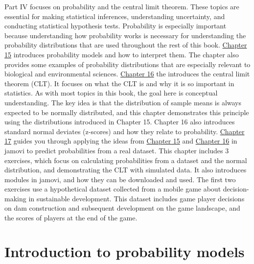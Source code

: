 \documentclass[
]{scrbook}
\begin{document}
Part IV focuses on probability and the central limit theorem.
These topics are essential for making statistical inferences, understanding uncertainty, and conducting statistical hypothesis tests.
Probability is especially important because understanding how probability works is necessary for understanding the probability distributions that are used throughout the rest of this book.
\protect\hyperlink{Chapter_15}{Chapter 15} introduces probability models and how to interpret them.
The chapter also provides some examples of probability distributions that are especially relevant to biological and environmental sciences.
\protect\hyperlink{Chapter_16}{Chapter 16} the introduces the central limit theorem (CLT).
It focuses on what the CLT is and why it is so important in statistics.
As with most topics in this book, the goal here is conceptual understanding.
The key idea is that the distribution of sample means is always expected to be normally distributed, and this chapter demonstrates this principle using the distributions introduced in Chapter 15.
Chapter 16 also introduces standard normal deviates (z-scores) and how they relate to probability.
\protect\hyperlink{Chapter_17}{Chapter 17} guides you through applying the ideas from \protect\hyperlink{Chapter_15}{Chapter 15} and \protect\hyperlink{Chapter_16}{Chapter 16} in jamovi to predict probabilities from a real dataset.
This chapter includes 3 exercises, which focus on calculating probabilities from a dataset and the normal distribution, and demonstrating the CLT with simulated data.
It also introduces modules in jamovi, and how they can be downloaded and used.
The first two exercises use a hypothetical dataset collected from a mobile game about decision-making in sustainable development.
This dataset includes game player decisions on dam construction and subsequent development on the game landscape, and the scores of players at the end of the game.

\hypertarget{Chapter_15}{%
\chapter{Introduction to probability models}\label{Chapter_15}}
\end{document}
